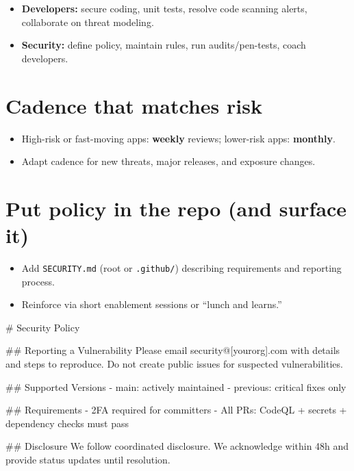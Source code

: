 \documentclass[11pt]{article}
\begin{document}
\begin{itemize}
  \item \textbf{Developers:} secure coding, unit tests, resolve code scanning alerts, collaborate on threat modeling.
  \item \textbf{Security:} define policy, maintain rules, run audits/pen-tests, coach developers.
\end{itemize}

\section{Cadence that matches risk}

\begin{itemize}
  \item High-risk or fast-moving apps: \textbf{weekly} reviews; lower-risk apps: \textbf{monthly}.
  \item Adapt cadence for new threats, major releases, and exposure changes.
\end{itemize}

\section{Put policy in the repo (and surface it)}

\begin{itemize}
  \item Add \texttt{SECURITY.md} (root or \texttt{.github/}) describing requirements and reporting process.
  \item Reinforce via short enablement sessions or ``lunch and learns.''
\end{itemize}

\begin{codelisting}[h]
\caption{\texttt{SECURITY.md} starter skeleton}
\begin{textcode}
# Security Policy

## Reporting a Vulnerability
Please email security@[yourorg].com with details and steps to reproduce.
Do not create public issues for suspected vulnerabilities.

## Supported Versions
- main: actively maintained
- previous: critical fixes only

## Requirements
- 2FA required for committers
- All PRs: CodeQL + secrets + dependency checks must pass

## Disclosure
We follow coordinated disclosure. We acknowledge within 48h and provide
status updates until resolution.
\end{textcode}
\end{codelisting}
\end{document}
